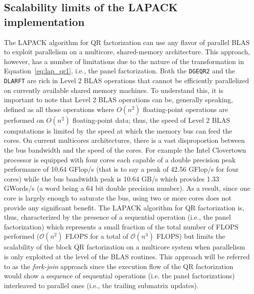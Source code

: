 \documentclass[runningheads]{llncs}
\begin{document}
\subsection{Scalability limits of the LAPACK implementation}
The LAPACK algorithm for QR factorization can use any flavor of parallel BLAS to exploit
parallelism on a multicore, shared-memory architecture.
This approach, however, has a number of limitations due to the nature
of the transformation in Equation~\eqref{eq:lap_qr1}, i.e., the panel
factorization. Both the \texttt{DGEQR2} and the \texttt{DLARFT} are
rich in Level 2 BLAS operations that cannot be efficiently parallelized on
currently available shared memory machines. To understand this, it is
important to note that Level 2 BLAS operations can be, generally speaking,
defined as all those operations where $O(n^2)$ floating-point operations
are performed on $O(n^2)$ floating-point data; thus, the speed of Level 2 BLAS
computations is limited by the speed at which the memory bus can feed
the cores. On current multicores architectures, there is a vast
disproportion between the bus bandwidth and the speed of the
cores. For example the Intel Clovertown processor is equipped with four cores each
capable of a double precision peak performance of 10.64 GFlop/s (that is to say a peak of
42.56 GFlop/s for four cores) while the bus bandwidth peak is 10.64 GB/s which provides 1.33
GWords/s (a word being a 64 bit double precision number).
As a result, since one core is largely enough to saturate
the bus, using two or more cores does not provide any significant
benefit. The LAPACK algorithm for QR factorization is, thus,
characterized by the presence of a sequential operation (i.e., the
panel factorization) which represents a small fraction
of the total number of FLOPS performed ($\mathcal{O}(n^2)$ FLOPS
for a total of $\mathcal{O}(n^3)$ FLOPS) but
limits the scalability of the block QR factorization on a multicore
system when parallelism is only exploited at the level of the BLAS
routines. This approach will be referred to as the {\it   fork-join}
approach since the execution flow of the QR factorization would show a
sequence of sequential operations (i.e. the panel factorizations)
interleaved to parallel ones (i.e., the trailing submatrix updates).
\end{document}
